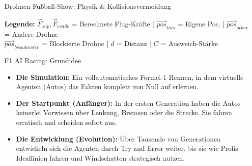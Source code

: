 \documentclass[aspectratio=169]{beamer}
\begin{document}
\begin{frame}{Drohnen Fußball-Show: Physik \& Kollisionsvermeidung}
\vfill
\begin{center}
\scriptsize
\textbf{Legende:} \quad
$\vec{F}_{sep}, \vec{F}_{evade}$ = Berechnete Flug-Kräfte \quad|\quad
$\vec{pos}_{this}$ = Eigene Pos. \quad|\quad 
$\vec{pos}_{other}$ = Andere Drohne \\
$\vec{pos}_{broadcaster}$ = Blockierte Drohne \quad|\quad 
$d$ = Distanz \quad|\quad 
$C$ = Ausweich-Stärke
\end{center}
\end{frame}



\begin{frame}{F1 AI Racing: Grundidee}
\begin{itemize}
    \item \textbf{Die Simulation:} Ein vollautomatisches Formel-1-Rennen, in dem virtuelle Agenten (Autos) das Fahren komplett von Null auf erlernen.
    \item \textbf{Der Startpunkt (Anfänger):} In der ersten Generation haben die Autos keinerlei Vorwissen über Lenkung, Bremsen oder die Strecke. Sie fahren erratisch und scheiden sofort aus.
    \item \textbf{Die Entwicklung (Evolution):} Über Tausende von Generationen entwickeln sich die Agenten durch Try and Error weiter, bis sie wie Profis Ideallinien fahren und Windschatten strategisch nutzen.
\end{itemize}
\end{frame}
\end{document}

